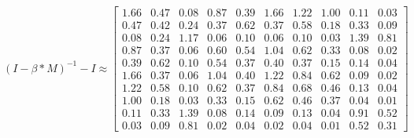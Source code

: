 \begin{equation}
	(I - \beta * M)^{-1} - I \approx \begin{bmatrix}
		1.66 & 0.47 & 0.08 & 0.87 & 0.39 & 1.66 & 1.22 & 1.00 & 0.11 & 0.03\\
		0.47 & 0.42 & 0.24 & 0.37 & 0.62 & 0.37 & 0.58 & 0.18 & 0.33 & 0.09\\
		0.08 & 0.24 & 1.17 & 0.06 & 0.10 & 0.06 & 0.10 & 0.03 & 1.39 & 0.81\\
		0.87 & 0.37 & 0.06 & 0.60 & 0.54 & 1.04 & 0.62 & 0.33 & 0.08 & 0.02\\
		0.39 & 0.62 & 0.10 & 0.54 & 0.37 & 0.40 & 0.37 & 0.15 & 0.14 & 0.04\\
		1.66 & 0.37 & 0.06 & 1.04 & 0.40 & 1.22 & 0.84 & 0.62 & 0.09 & 0.02\\
		1.22 & 0.58 & 0.10 & 0.62 & 0.37 & 0.84 & 0.68 & 0.46 & 0.13 & 0.04\\
		1.00 & 0.18 & 0.03 & 0.33 & 0.15 & 0.62 & 0.46 & 0.37 & 0.04 & 0.01\\
		0.11 & 0.33 & 1.39 & 0.08 & 0.14 & 0.09 & 0.13 & 0.04 & 0.91 & 0.52\\
		0.03 & 0.09 & 0.81 & 0.02 & 0.04 & 0.02 & 0.04 & 0.01 & 0.52 & 0.31
	\end{bmatrix}
	\label{frml:berechnungDerKatzZentralitaet:formel5}
\end{equation}